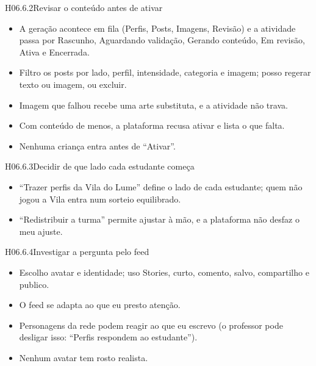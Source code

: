 \begin{historia}{H06.6.2}{Revisar o conteúdo antes de ativar}{\pronto}
\aceite
\begin{itemize}
  \item A geração acontece em fila (Perfis, Posts, Imagens, Revisão) e a
    atividade passa por Rascunho, Aguardando validação, Gerando conteúdo, Em
    revisão, Ativa e Encerrada.
  \item Filtro os posts por lado, perfil, intensidade, categoria e imagem;
    posso regerar texto ou imagem, ou excluir.
  \item Imagem que falhou recebe uma arte substituta, e a atividade não trava.
  \item Com conteúdo de menos, a plataforma recusa ativar e lista o que falta.
  \item Nenhuma criança entra antes de \enquote{Ativar}.
\end{itemize}
\end{historia}

\begin{historia}{H06.6.3}{Decidir de que lado cada estudante começa}{\pronto}
\aceite
\begin{itemize}
  \item \enquote{Trazer perfis da Vila do Lume} define o lado de cada
    estudante; quem não jogou a Vila entra num sorteio equilibrado.
  \item \enquote{Redistribuir a turma} permite ajustar à mão, e a plataforma
    não desfaz o meu ajuste.
\end{itemize}
\end{historia}

\begin{historia}{H06.6.4}{Investigar a pergunta pelo feed}{\pronto}
\aceite
\begin{itemize}
  \item Escolho avatar e identidade; uso Stories, curto, comento, salvo,
    compartilho e publico.
  \item O feed se adapta ao que eu presto atenção.
  \item Personagens da rede podem reagir ao que eu escrevo (o professor pode
    desligar isso: \enquote{Perfis respondem ao estudante}).
  \item Nenhum avatar tem rosto realista.
\end{itemize}
\end{historia}

